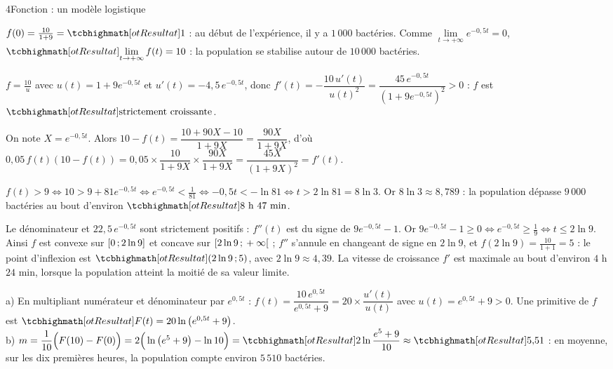 \begin{corrigeBac}{4}{Fonction : un modèle logistique}
\begin{questions}
  \item $f(0)=\frac{10}{1+9}=\res{1}$ : au début de l'expérience, il y a $1\,000$ bactéries. Comme $\lim\limits_{t\to+\infty}e^{-0{,}5t}=0$,
    $\res{\lim\limits_{t\to+\infty}f(t)=10}$ : la population se stabilise autour de $10\,000$ bactéries. 
  \item $f=\frac{10}{u}$ avec $u(t)=1+9e^{-0{,}5t}$ et $u'(t)=-4{,}5\,e^{-0{,}5t}$, donc
    $f'(t)=-\dfrac{10\,u'(t)}{u(t)^{2}}=\dfrac{45\,e^{-0{,}5t}}{\left(1+9e^{-0{,}5t}\right)^{2}}>0$ : $f$ est $\res{\text{strictement croissante}}$. 
  \item On note $X=e^{-0{,}5t}$. Alors $10-f(t)=\dfrac{10+90X-10}{1+9X}=\dfrac{90X}{1+9X}$, d'où
    $0{,}05\,f(t)\left(10-f(t)\right)=0{,}05\times\dfrac{10}{1+9X}\times\dfrac{90X}{1+9X}=\dfrac{45X}{(1+9X)^{2}}=f'(t)$. 
  \item $f(t)>9\iff10>9+81e^{-0{,}5t}\iff e^{-0{,}5t}<\frac1{81}\iff-0{,}5t<-\ln81\iff t>2\ln81=8\ln3$. Or $8\ln3\approx8{,}789$ :
    la population dépasse $9\,000$ bactéries au bout d'environ $\res{8\text{ h }47\text{ min}}$. 
  \item Le dénominateur et $22{,}5\,e^{-0{,}5t}$ sont strictement positifs : $f''(t)$ est du signe de $9e^{-0{,}5t}-1$. Or
    $9e^{-0{,}5t}-1\geq0\iff e^{-0{,}5t}\geq\frac19\iff t\leq2\ln9$. Ainsi $f$ est convexe sur $\mathopen{[}0\,{;}\,2\ln9\mathclose{]}$ et concave sur
    $\mathopen{[}2\ln9\,{;}\,+\infty\mathclose{[}$ ; $f''$ s'annule en changeant de signe en $2\ln9$, et $f(2\ln9)=\frac{10}{1+1}=5$ : le point d'inflexion est
    $\res{\left(2\ln9\pv5\right)}$, avec $2\ln9\approx4{,}39$. La vitesse de croissance $f'$ est maximale au bout d'environ $4$ h $24$ min,
    lorsque la population atteint la moitié de sa valeur limite. 
  \item a) En multipliant numérateur et dénominateur par $e^{0{,}5t}$ : $f(t)=\dfrac{10\,e^{0{,}5t}}{e^{0{,}5t}+9}=20\times\dfrac{u'(t)}{u(t)}$
    avec $u(t)=e^{0{,}5t}+9>0$. Une primitive de $f$ est $\res{F(t)=20\ln\left(e^{0{,}5t}+9\right)}$.\\
    b) $m=\dfrac{1}{10}\Big(F(10)-F(0)\Big)=2\Big(\ln\left(e^{5}+9\right)-\ln10\Big)=\res{2\ln\dfrac{e^{5}+9}{10}}\approx\res{5{,}51}$ : en
    moyenne, sur les dix premières heures, la population compte environ $5\,510$ bactéries. \pts{1 pt}
\end{questions}
\end{corrigeBac}
